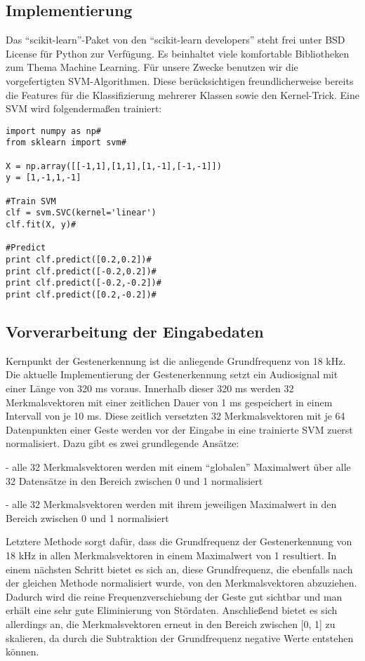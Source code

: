 \newpage

\subsection{Implementierung}

Das “scikit-learn”-Paket von den “scikit-learn developers” steht frei unter BSD License für Python zur Verfügung. 
Es beinhaltet viele komfortable Bibliotheken zum Thema Machine Learning. 
Für unsere Zwecke benutzen wir die vorgefertigten SVM-Algorithmen. 
Diese berücksichtigen freundlicherweise bereits die Features für die Klassifizierung mehrerer Klassen sowie den Kernel-Trick. Eine SVM wird folgendermaßen trainiert:

\begin{lstlisting}
import numpy as np#
from sklearn import svm#

X = np.array([[-1,1],[1,1],[1,-1],[-1,-1]])
y = [1,-1,1,-1]

#Train SVM
clf = svm.SVC(kernel='linear')
clf.fit(X, y)#

#Predict
print clf.predict([0.2,0.2])#
print clf.predict([-0.2,0.2])#
print clf.predict([-0.2,-0.2])#
print clf.predict([0.2,-0.2])#
\end{lstlisting}


\subsection{Vorverarbeitung der Eingabedaten}

Kernpunkt der Gestenerkennung ist die anliegende Grundfrequenz von 18 kHz. 
Die aktuelle Implementierung der Gestenerkennung setzt ein Audiosignal mit einer Länge von 320 ms voraus. 
Innerhalb dieser 320 ms werden 32 Merkmalsvektoren mit einer zeitlichen Dauer von 1 ms gespeichert in einem Intervall von je 10 ms. 
Diese zeitlich versetzten 32 Merkmalsvektoren mit je 64 Datenpunkten einer Geste werden vor der Eingabe in eine trainierte SVM zuerst normalisiert. 
Dazu gibt es zwei grundlegende Ansätze:

- alle 32 Merkmalsvektoren werden mit einem “globalen” Maximalwert über alle 32 Datensätze in den Bereich zwischen 0 und 1 normalisiert\newline

- alle 32 Merkmalsvektoren werden mit ihrem jeweiligen Maximalwert in den Bereich zwischen 0 und 1 normalisiert

Letztere Methode sorgt dafür, dass die Grundfrequenz der Gestenerkennung von 18 kHz in allen Merkmalsvektoren in einem Maximalwert von 1 resultiert. 
In einem nächsten Schritt bietet es sich an, diese Grundfrequenz, die ebenfalls nach der gleichen Methode normalisiert wurde, von den Merkmalsvektoren abzuziehen. 
Dadurch wird die reine Frequenzverschiebung der Geste gut sichtbar und man erhält eine sehr gute Eliminierung von Stördaten. 
Anschließend bietet es sich allerdings an, die Merkmalsvektoren erneut in den Bereich zwischen [0, 1] zu skalieren, da durch die Subtraktion der Grundfrequenz negative Werte entstehen können.


